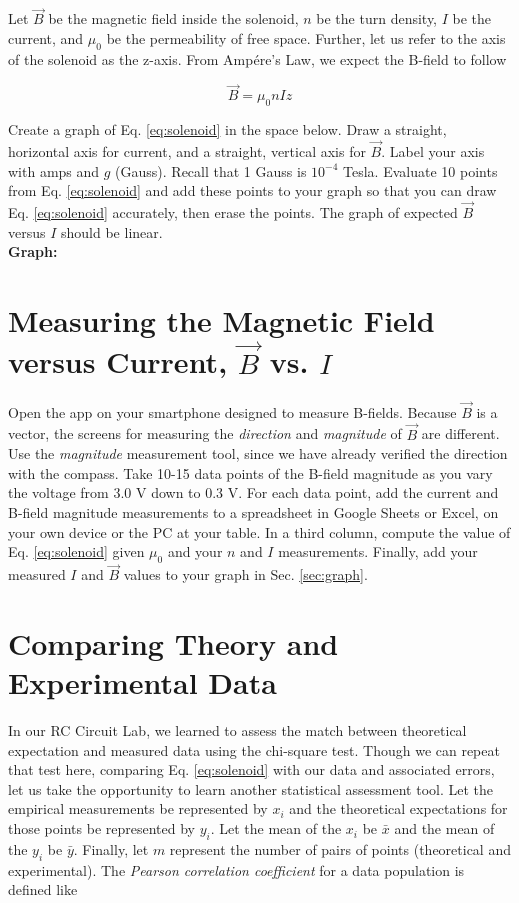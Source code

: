 \documentclass[12pt]{article}
\begin{document}
Let $\vec{B}$ be the magnetic field inside the solenoid, $n$ be the turn density, $I$ be the current, and $\mu_0$ be the permeability of free space.  Further, let us refer to the axis of the solenoid as the z-axis.  From Amp\'{e}re's Law, we expect the B-field to follow

\begin{equation}
\vec{B} = \mu_0 n I \hat{z} \label{eq:solenoid}
\end{equation}

\noindent
Create a graph of Eq. \ref{eq:solenoid} in the space below.  Draw a straight, horizontal axis for current, and a straight, vertical axis for $\vec{B}$.  Label your axis with amps and $g$ (Gauss).  Recall that 1 Gauss is $10^{-4}$ Tesla.  Evaluate 10 points from Eq. \ref{eq:solenoid} and add these points to your graph so that you can draw Eq. \ref{eq:solenoid} accurately, then erase the points. The graph of expected $\vec{B}$ versus $I$ should be linear. \\

\noindent
\textbf{Graph:}
\vspace{5cm}

\section{Measuring the Magnetic Field versus Current, $\vec{B}$ vs. $I$}

\noindent
Open the app on your smartphone designed to measure B-fields.  Because $\vec{B}$ is a vector, the screens for measuring the \textit{direction} and \textit{magnitude} of $\vec{B}$ are different.  Use the \textit{magnitude} measurement tool, since we have already verified the direction with the compass.  Take 10-15 data points of the B-field magnitude as you vary the voltage from 3.0 V down to 0.3 V.  For each data point, add the current and B-field magnitude measurements to a spreadsheet in Google Sheets or Excel, on your own device or the PC at your table.  In a third column, compute the value of Eq. \ref{eq:solenoid} given $\mu_0$ and your $n$ and $I$ measurements.  Finally, add your measured $I$ and $\vec{B}$ values to your graph in Sec. \ref{sec:graph}.

\section{Comparing Theory and Experimental Data}

\noindent
In our RC Circuit Lab, we learned to assess the match between theoretical expectation and measured data using the chi-square test.  Though we can repeat that test here, comparing Eq. \ref{eq:solenoid} with our data and associated errors, let us take the opportunity to learn another statistical assessment tool.  Let the empirical measurements be represented by $x_i$ and the theoretical expectations for those points be represented by $y_i$.  Let the mean of the $x_i$ be $\bar{x}$ and the mean of the $y_i$ be $\bar{y}$.  Finally, let $m$ represent the number of pairs of points (theoretical and experimental).  The \textit{Pearson correlation coefficient} for a data population is defined like
\end{document}
